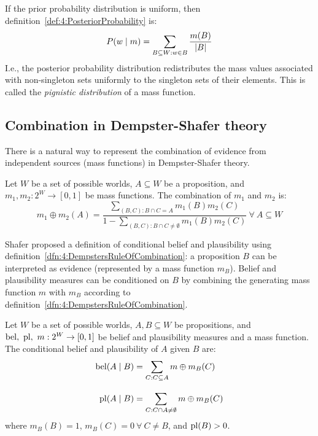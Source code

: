 If the prior probability distribution is uniform, then
definition~\ref{def:4:PosteriorProbability} is:
\begin{equation*}
  P(w \mid m) = \sum_{B \subseteq W : w \in B} \frac{m(B)}{|B|}
\end{equation*}
I.e., the posterior probability distribution redistributes the
mass values associated with non-singleton sets uniformly to the singleton sets
of their elements.
This is called the \textit{pignistic distribution} of a mass function.

\subsection{Combination in Dempster-Shafer theory}

There is a natural way to represent the combination of evidence from
independent sources (mass functions) in Dempster-Shafer theory.

\begin{dfn}
  \label{dfn:4:DempstersRuleOfCombination}
  Let $W$ be a set of possible worlds, $A \subseteq W$ be a proposition, and
  $m_1, m_2 : 2^W \to [0, 1]$ be mass functions.
  The combination of $m_1$ and $m_2$ is:
  \begin{equation}
    \label{eqn:4:DempstersRuleOfCombination}
    m_1 \oplus m_2 (A)
    = \frac{
      \sum_{(B, C) : B \cap C = A} m_1(B) m_2(C)
    }{
      1 - \sum_{(B, C) : B \cap C \neq \emptyset} m_1(B) m_2(C)
    } \ \forall\ A \subseteq W
  \end{equation}
\end{dfn}

Shafer proposed a definition of conditional belief and plausibility using
definition~\ref{dfn:4:DempstersRuleOfCombination}: a proposition $B$ can be
interpreted as evidence (represented by a mass function $m_B$).
Belief and plausibility measures can be conditioned on $B$ by combining the
generating mass function $m$ with $m_B$ according to
definition~\ref{dfn:4:DempstersRuleOfCombination}.

\begin{dfn}
  \label{dfn:4:ConditionalBeliefPlausibility}
  Let $W$ be a set of possible worlds, $A, B \subseteq W$ be propositions, and
  $\operatorname*{bel},\ \operatorname*{pl},\ m : 2^W \to [0, 1]$ be belief and plausibility measures and a
  mass function.
  The conditional belief and plausibility of $A$ given $B$ are:
  \begin{align}
    \label{eqn:4:ConditionalBelief}
    \operatorname*{bel}(A \mid B)
     & = \sum_{C : C \subseteq A} m \oplus m_B(C)
    \\[2ex]
    \label{eqn:4:ConditionalPlausibility}
    \operatorname*{pl}(A \mid B)
     & = \sum_{C : C \cap A \neq \emptyset} m \oplus m_B(C)
  \end{align}
  where $m_B(B) = 1$, $m_B(C) = 0\ \forall\ C \neq B$, and $\operatorname*{pl}(B) > 0$.
\end{dfn}

